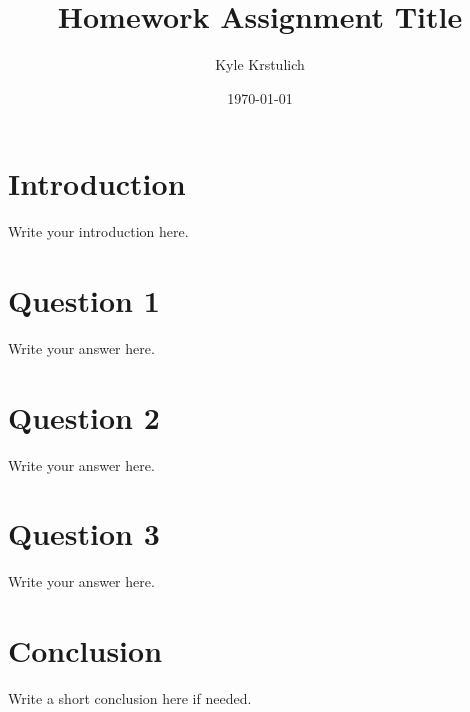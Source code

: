 \documentclass[12pt]{article}
\title{Homework Assignment Title}
\author{Kyle Krstulich}
\date{\today}
\begin{document}
\maketitle

\section*{Introduction}
Write your introduction here.

\section*{Question 1}
Write your answer here.

\section*{Question 2}
Write your answer here.

\section*{Question 3}
Write your answer here.

\section*{Conclusion}
Write a short conclusion here if needed.
\end{document}
